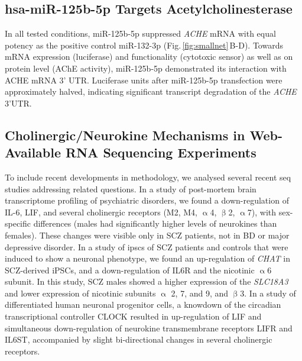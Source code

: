 \begin{method}
\end{method}

\subsection{hsa-miR-125b-5p Targets Acetylcholinesterase}
In all tested conditions, miR-125b-5p suppressed \emph{ACHE} mRNA with equal potency as the positive control miR-132-3p (Fig.\,\ref{fig:smallnet}\,B-D). Towards mRNA expression (luciferase) and functionality (cytotoxic sensor) as well as on protein level (AChE activity), miR-125b-5p demonstrated its interaction with ACHE mRNA 3' UTR. Luciferase units after miR-125b-5p transfection were approximately halved, indicating significant transcript degradation of the \emph{ACHE} 3'UTR.

\subsection{Cholinergic/Neurokine Mechanisms in Web-Available RNA Sequencing Experiments}
To include recent developments in methodology, we analysed several recent \ac{seq} studies addressing related questions. In a study of post-mortem brain transcriptome profiling of psychiatric disorders,\cite{Ramaker2017} we found a down-regulation of IL-6, LIF, and several cholinergic receptors (M2, M4, $\upalpha$4, $\upbeta$2, $\upalpha$7), with sex-specific differences (males had significantly higher levels of neurokines than females). These changes were visible only in SCZ patients, not in BD or major depressive disorder. In a study of \acp{ipsc} of SCZ patients and controls that were induced to show a neuronal phenotype,\cite{Hoffman2017} we found an up-regulation of \emph{CHAT} in SCZ-derived iPSCs, and a down-regulation of IL6R and the nicotinic $\upalpha$6 subunit. In this study, SCZ males showed a higher expression of the \emph{SLC18A3} and lower expression of nicotinic subunits $\upalpha$ 2, 7, and 9, and $\upbeta$3. In a study of differentiated human neuronal progenitor cells,\cite{Fontenot2017} a knowdown of the circadian transcriptional controller CLOCK resulted in up-regulation of LIF and simultaneous down-regulation of neurokine transmembrane receptors LIFR and IL6ST, accompanied by slight bi-directional changes in several cholinergic receptors.
